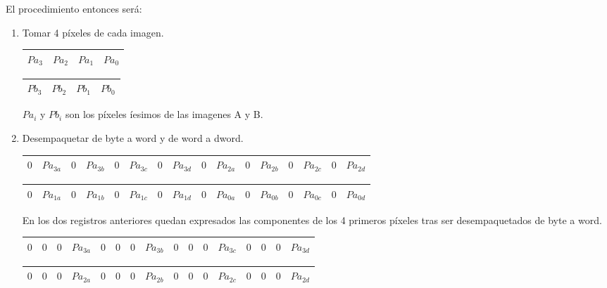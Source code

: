 El procedimiento entonces será:

\begin{enumerate}
\item Tomar 4 píxeles de cada imagen.

\begin{tabular}{| o | o | o | o |} %
\hline
$Pa_{3}$ & $Pa_{2}$ & $Pa_{1}$ & $Pa_{0}$ \\ 
\hline
\end{tabular}

\begin{tabular}{| g | g | g | g |} %
\hline
$Pb_{3}$ & $Pb_{2}$ & $Pb_{1}$ & $Pb_{0}$ \\
\hline
\end{tabular}

$Pa_{i}$ y $Pb_{i}$ son los píxeles íesimos de las imagenes A y B.\\

\item Desempaquetar de byte a word y de word a dword.

\begin{tabular}{| o | o | o | o | o | o | o | o | o | o | o | o | o | o | o | o |} %
\hline
$0$ & $Pa_{3a}$ & $0$ & $Pa_{3b}$ & $0$ & $Pa_{3c}$ & $0$ & $Pa_{3d}$ & $0$ & $Pa_{2a}$ & $0$ & $Pa_{2b}$ & $0$ & $Pa_{2c}$ & $0$ & $Pa_{2d}$ \\ 
\hline
\end{tabular}

\begin{tabular}{| o | o | o | o | o | o | o | o | o | o | o | o | o | o | o | o |} %
\hline
$0$ & $Pa_{1a}$ & $0$ & $Pa_{1b}$ & $0$ & $Pa_{1c}$ & $0$ & $Pa_{1d}$ & $0$ & $Pa_{0a}$ & $0$ & $Pa_{0b}$ & $0$ & $Pa_{0c}$ & $0$ & $Pa_{0d}$ \\ 
\hline
\end{tabular}

En los dos registros anteriores quedan expresados las componentes de los 4 primeros píxeles tras ser desempaquetados de byte a word.

\begin{tabular}{| o | o | o | o | o | o | o | o | o | o | o | o | o | o | o | o |} %
\hline
$0$ & $0$ & $0$ & $Pa_{3a}$ & $0$ & $0$ & $0$ & $Pa_{3b}$ & $0$ & $0$ & $0$ & $Pa_{3c}$ & $0$ & $0$ & $0$ & $Pa_{3d}$ \\ 
\hline
\end{tabular}

\begin{tabular}{| o | o | o | o | o | o | o | o | o | o | o | o | o | o | o | o |} %
\hline
$0$ & $0$ & $0$ & $Pa_{2a}$ & $0$ & $0$ & $0$ & $Pa_{2b}$ & $0$ & $0$ & $0$ & $Pa_{2c}$ & $0$ & $0$ & $0$ & $Pa_{2d}$ \\ 
\hline
\end{tabular}


\end{enumerate}
